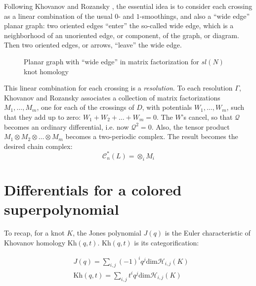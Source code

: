 \documentclass[a4paper,titlepage,twoside]{book}
\begin{document}
Following Khovanov and Rozansky \cite{KhovanovRozansky2004}, the essential idea is to consider each crossing as a linear combination of the usual $0$- and $1$-smoothings, and also a ``wide edge'' planar graph: two oriented edges ``enter'' the so-called wide edge, which is a neighborhood of an unoriented edge, or component, of the graph, or diagram.  Then two oriented edges, or arrows, ``leave'' the wide edge.  
\begin{figure}[h]
  \begin{center}
\end{center}
  \caption{Planar graph with ``wide edge'' in matrix factorization for $sl{(N)}$ knot homology}
\end{figure}
This linear combination for each crossing is a \emph{resolution}.  To each resolution $\Gamma$, Khovanov and Rozansky associates a collection of matrix factorizations $M_1, \dots , M_m$, one for each of the crossings of $D$, with potentials $W_1, \dots , W_m$, such that they add up to zero: $W_1 + W_2 + \dots + W_m =0$.   The $W$'s cancel, so that $\mathcal{Q}$ becomes an ordinary differential, i.e. now $\mathcal{Q}^2=0$.  Also, the tensor product $M_1 \otimes M_2 \otimes \dots \otimes M_m$ becomes a two-periodic complex.   The result becomes the desired chain complex:
\begin{equation}
  \mathcal{C}^*_{n}{ (L)} = \otimes_i M_i
\end{equation}

 \section{Differentials for a colored superpolynomial}

To recap, for a knot $K$, the Jones polynomial $J(q)$ is the Euler characteristic of Khovanov homology $\text{Kh}{(q,t)}$.  $\text{Kh}{(q,t)}$ is its categorification:

\begin{align}
  & J(q) = \sum_{i,j} (-1)^i q^j \text{dim}{ \mathcal{H}_{i,j}{(K)} } \\
   & \text{Kh}{ (q,t)} = \sum_{i,j} t^i q^j \text{dim}{ \mathcal{H}_{i,j}{(K)} }
\end{align}
\end{document}
